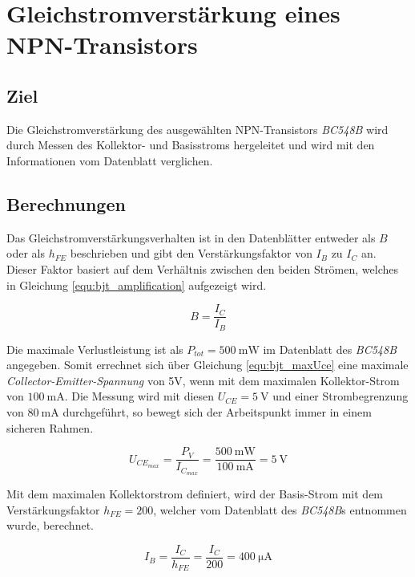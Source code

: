 \documentclass[../main.tex]{subfiles}
\begin{document}
\section{Gleichstromverstärkung eines NPN-Transistors}

\subsection{Ziel}

Die Gleichstromverstärkung des ausgewählten NPN-Transistors \textit{BC548B} wird durch Messen des Kollektor- und Basisstroms hergeleitet und wird mit den Informationen vom Datenblatt verglichen. 


\subsection{Berechnungen}

Das Gleichstromverstärkungsverhalten ist in den Datenblätter entweder als $B$ oder als $h_{FE}$ beschrieben und gibt den Verstärkungsfaktor von $I_B$ zu $I_C$ an. Dieser Faktor basiert auf dem Verhältnis zwischen den beiden Strömen, welches in Gleichung \ref{equ:bjt_amplification} aufgezeigt wird.

\begin{equation}
    B = \frac{I_C}{I_B}
    \label{equ:bjt_amplification}
\end{equation}

Die maximale Verlustleistung ist als $P_{tot} = \SI{500}{\milli\watt}$ im Datenblatt des \textit{BC548B} angegeben. Somit errechnet sich über Gleichung \ref{equ:bjt_maxUce} eine maximale \textit{Collector-Emitter-Spannung} von 5V, wenn mit dem maximalen Kollektor-Strom von $\SI{100}{\milli\ampere}$. Die Messung wird mit diesen $U_{CE} = \SI{5}{\volt}$ und einer Strombegrenzung von $\SI{80}{\milli\ampere}$ durchgeführt, so bewegt sich der Arbeitspunkt immer in einem sicheren Rahmen.

\begin{equation}
    U_{CE_{max}} = \frac{P_V}{I_{C_{max}}} = \frac{\SI{500}{\milli\watt}}{\SI{100}{\milli\ampere}} = \SI{5}{\volt}
    \label{equ:bjt_maxUce}
\end{equation}

Mit dem maximalen Kollektorstrom definiert, wird der Basis-Strom mit dem Verstärkungsfaktor $h_{FE} = 200$, welcher vom Datenblatt des \textit{BC548B}s entnommen wurde, berechnet.

\begin{equation}
    I_B = \frac{I_C}{h_{FE}} = \frac{I_C}{200} = \SI{400}{\micro\ampere}
\end{equation}
\end{document}
